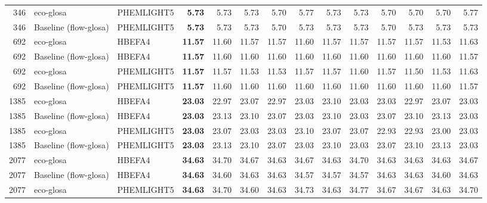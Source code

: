 \begin{table}[htb]
{\begin{tabular}{r l l r *{10}{r}}
    346  & \ac{eco-glosa}              & PHEMLIGHT5       & \textbf{5.73} & 5.73  & 5.73  & 5.70  & 5.77  & 5.73  & 5.73  & 5.70  & 5.70  & 5.70  & 5.77  \\
    346  & Baseline (\ac{flow-glosa})  & PHEMLIGHT5       & \textbf{5.73} & 5.73  & 5.73  & 5.70  & 5.73  & 5.73  & 5.73  & 5.70  & 5.73  & 5.73  & 5.73  \\
    \midrule
    692  & \ac{eco-glosa}              & HBEFA4           & \textbf{11.57} & 11.60 & 11.57 & 11.57 & 11.60 & 11.57 & 11.57 & 11.57 & 11.57 & 11.53 & 11.63 \\
    692  & Baseline (\ac{flow-glosa})  & HBEFA4           & \textbf{11.57} & 11.60 & 11.60 & 11.60 & 11.60 & 11.60 & 11.60 & 11.60 & 11.60 & 11.60 & 11.57 \\
    692  & \ac{eco-glosa}              & PHEMLIGHT5       & \textbf{11.57} & 11.57 & 11.53 & 11.53 & 11.57 & 11.57 & 11.60 & 11.57 & 11.50 & 11.53 & 11.63 \\
    692  & Baseline (\ac{flow-glosa})  & PHEMLIGHT5       & \textbf{11.57} & 11.60 & 11.60 & 11.60 & 11.60 & 11.60 & 11.60 & 11.60 & 11.60 & 11.60 & 11.57 \\
    \midrule
    1385 & \ac{eco-glosa}              & HBEFA4           & \textbf{23.03} & 22.97 & 23.07 & 22.97 & 23.03 & 23.10 & 23.03 & 23.03 & 22.97 & 23.07 & 23.03 \\
    1385 & Baseline (\ac{flow-glosa})  & HBEFA4           & \textbf{23.03} & 23.13 & 23.10 & 23.07 & 23.03 & 23.10 & 23.03 & 23.07 & 23.10 & 23.13 & 23.03 \\
    1385 & \ac{eco-glosa}              & PHEMLIGHT5       & \textbf{23.03} & 23.07 & 23.03 & 23.03 & 23.10 & 23.07 & 23.07 & 22.93 & 22.93 & 23.00 & 23.03 \\
    1385 & Baseline (\ac{flow-glosa})  & PHEMLIGHT5       & \textbf{23.03} & 23.13 & 23.10 & 23.07 & 23.03 & 23.10 & 23.03 & 23.07 & 23.10 & 23.13 & 23.03 \\
    \midrule
    2077 & \ac{eco-glosa}              & HBEFA4           & \textbf{34.63} & 34.70 & 34.67 & 34.63 & 34.67 & 34.63 & 34.70 & 34.63 & 34.63 & 34.63 & 34.67 \\
    2077 & Baseline (\ac{flow-glosa})  & HBEFA4           & \textbf{34.63} & 34.60 & 34.63 & 34.63 & 34.57 & 34.57 & 34.57 & 34.63 & 34.63 & 34.60 & 34.63 \\
    2077 & \ac{eco-glosa}              & PHEMLIGHT5       & \textbf{34.63} & 34.70 & 34.60 & 34.63 & 34.73 & 34.63 & 34.77 & 34.67 & 34.67 & 34.63 & 34.70 \\

\end{tabular}}
\end{table}

